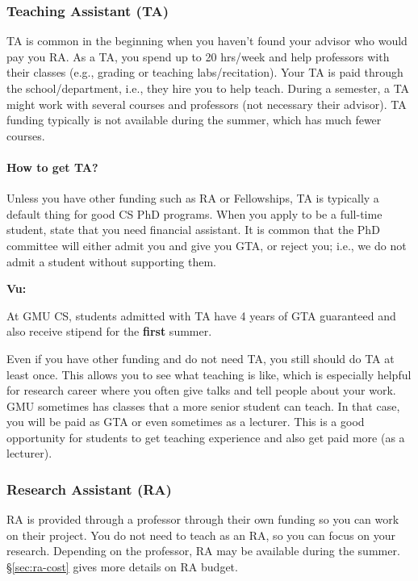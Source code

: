 \documentclass[11pt]{article}
\newenvironment{commentbox}[1][]{
\small
    \begin{cbox}
    \textbf{#1} 
 }{
   \end{cbox}
}
\begin{document}
\subsubsection{Teaching Assistant (TA)}

TA is common in the beginning when you haven't found your advisor who would pay you RA. As a TA, you spend up to 20 hrs/week and help professors with their classes (e.g., grading or teaching labs/recitation). Your TA is paid through the school/department, i.e., they hire you to help teach.  During a semester, a TA might work with several courses and professors (not necessary their advisor).  TA funding typically is not available during the summer, which has much fewer courses.

\paragraph{How to get TA?}  Unless you have other funding such as RA or Fellowships, TA is typically a default thing for good CS PhD programs. When you apply to be a full-time student,  state that you need financial assistant. It is common that the PhD committee will either admit you and give you GTA, or reject you; i.e., we do not admit a student without supporting them.  

\begin{commentbox}[Vu:]
At GMU CS, students admitted with TA have  4 years of GTA guaranteed and also receive  stipend for the \textbf{first} summer.
\end{commentbox}

Even if you have other funding and do not need TA, you still should do TA at least once.  This allows you to see what teaching is like, which is especially helpful for research career where you often give talks and tell people about your work. GMU sometimes has classes that a more senior student can teach.  In that case, you will be paid as GTA or even sometimes as a lecturer.  This is a good opportunity for students to get teaching experience and also get paid more (as a lecturer).

\subsubsection{Research Assistant (RA)}
RA is provided through a professor through their own funding so you can work on their project.  
You do not need to teach as an RA, so you can focus on your research. Depending on the professor, RA may be available during the summer. \S\ref{sec:ra-cost} gives more details on RA budget.
\end{document}
